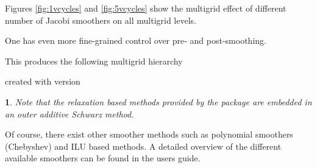 \documentclass[10pt,fleqn]{book}
\newtheorem*{mycomment}{\ding{42}}
\newcommand\printScreenOutput[1]{

{\vspace{-0.3cm}\hfill\tiny{created with \muelu version }}
}
\begin{document}
Figures \ref{fig:1vcycles} and \ref{fig:5vcycles} show the multigrid effect of different number of Jacobi smoothers on all multigrid levels.

One has even more fine-grained control over pre- and post-smoothing.

This produces the following multigrid hierarchy
\printScreenOutput{s1_easy_jacobi2.txt_3.fragment_3.fragment}

\begin{mycomment}
Note that the relaxation based methods provided by the \ifpack package are embedded in an outer additive Schwarz method.
\end{mycomment}

Of course, there exist other smoother methods such as polynomial smoothers (Chebyshev) and ILU based methods.
A detailed overview of the different available smoothers can be found in the \muelu users guide.
\end{document}
